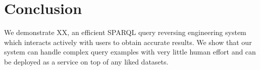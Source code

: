\documentclass[10pt,conference,letterpaper]{IEEEtran}
\begin{document}
\section{Conclusion}
We demonstrate XX, an efficient SPARQL query reversing engineering system which interacts actively with users to obtain accurate results. We show that our system can handle complex query examples with very little human effort and can be deployed as a service on top of any liked datasets. 






\end{document}
